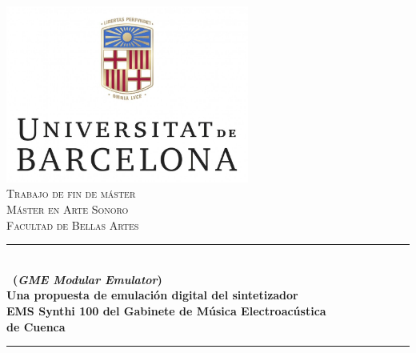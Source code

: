 \begin{titlepage}

\newcommand{\HRule}{\rule{\linewidth}{0.5mm}} %

\center %


\includegraphics[width=0.6\textwidth]{./portada/logoUB}\\[1cm] %
 

\textsc{\LARGE Trabajo de fin de máster}\\[1cm] %
\textsc{\Large Máster en Arte Sonoro}\\[0.5cm] %
\textsc{\large Facultad de Bellas Artes}\\[0.0cm] %


\HRule \\[0.0cm]
{ \Large \bfseries  \appName\ (\textit{GME Modular Emulator})\\ \vspace{0.4cm} \normalsize Una propuesta de emulación digital del sintetizador\\ EMS Synthi 100 del Gabinete de Música Electroacústica\\de Cuenca}\\[0.4cm] %
\HRule \\[0.3cm]
 

\end{titlepage}
